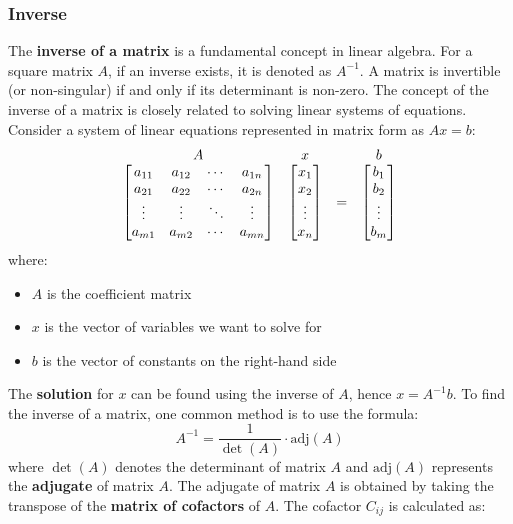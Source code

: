 \pagebreak
\subsubsection{Inverse}
The \textbf{inverse of a matrix} is a fundamental concept in linear algebra. For a square matrix $A$, if an inverse exists, it is denoted as $A^{-1}$. A matrix is invertible (or non-singular) if and only if its determinant is non-zero. The concept of the inverse of a matrix is closely related to solving linear systems of equations. Consider a system of linear equations represented in matrix form as $Ax = b$: 
$$
\begin{array}{@{}cccc@{}}
    A & x &  & b \\
    \begin{bmatrix}
        a_{11} & a_{12} & \cdots & a_{1n} \\
        a_{21} & a_{22} & \cdots & a_{2n} \\
        \vdots & \vdots & \ddots & \vdots \\
        a_{m1} & a_{m2} & \cdots & a_{mn}
    \end{bmatrix}
    &
    \begin{bmatrix}
        x_1 \\
        x_2 \\
        \vdots \\
        x_n
    \end{bmatrix}
    & = &
    \begin{bmatrix}
        b_1 \\
        b_2 \\
        \vdots \\
        b_m
    \end{bmatrix}
\end{array}
$$
where:
\begin{itemize}
    \item{$A$ is the coefficient matrix}
    \item{$x$ is the vector of variables we want to solve for}
    \item{$b$ is the vector of constants on the right-hand side}
\end{itemize}
The \textbf{solution} for $x$ can be found using the inverse of $A$, hence $x = A^{-1}b$. To find the inverse of a matrix, one common method is to use the formula:
$$
    A^{-1} = \frac{1}{\det(A)} \cdot \text{adj}(A)
$$
where $\det(A)$ denotes the determinant of matrix $A$ and $\text{adj}(A)$ represents the \textbf{adjugate} of matrix $A$. The adjugate of matrix $A$ is obtained by taking the transpose of the \textbf{matrix of cofactors} of $A$. The cofactor $C_{ij}$ is calculated as:
